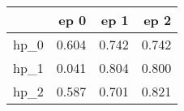 \begin{tabular}{lrrr}
\toprule
{} &   ep 0 &   ep 1 &   ep 2 \\
\midrule
hp\_0 &  0.604 &  0.742 &  0.742 \\
hp\_1 &  0.041 &  0.804 &  0.800 \\
hp\_2 &  0.587 &  0.701 &  0.821 \\
\bottomrule
\end{tabular}
